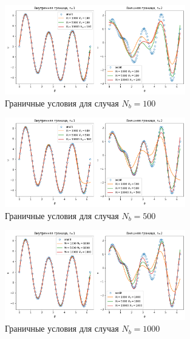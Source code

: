 \documentclass[a4paper,14pt]{extarticle} %
\begin{document}

\begin{figure}[ht]
    \center
    \includegraphics[width=0.7\textwidth]{../plots/termal/bnd l = (20x4) Nf=[1000, 5000, 10000] Nu=100.png}
    \caption{Граничные условия для случая $N_b=100$}
    \label{fig:termal_bnd1}
\end{figure}
\begin{figure}[ht]
    \center
    \includegraphics[width=0.7\textwidth]{../plots/termal/bnd l = (20x4) Nf=[1000, 5000, 10000] Nu=500.png}
    \caption{Граничные условия для случая $N_b=500$}
    \label{fig:termal_bnd2}
\end{figure}
\begin{figure}[ht]
    \center
    \includegraphics[width=0.7\textwidth]{../plots/termal/bnd l = (20x4) Nf=[1000, 5000, 10000] Nu=1000.png}
    \caption{Граничные условия для случая $N_b=1000$}
    \label{fig:termal_bnd3}
\end{figure}
\FloatBarrier
\end{document}
